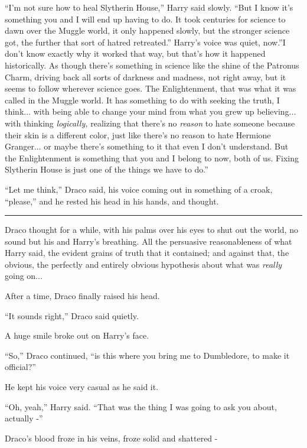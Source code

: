 ``I'm not sure how to heal Slytherin House,'' Harry said slowly. ``But I
know it's something you and I will end up having to do. It took
centuries for science to dawn over the Muggle world, it only happened
slowly, but the stronger science got, the further that sort of hatred
retreated.'' Harry's voice was quiet, now.''I don't know exactly why it
worked that way, but that's how it happened historically. As though
there's something in science like the shine of the Patronus Charm,
driving back all sorts of darkness and madness, not right away, but it
seems to follow wherever science goes. The Enlightenment, that was what
it was called in the Muggle world. It has something to do with seeking
the truth, I think... with being able to change your mind from what
you grew up believing... with thinking \emph{logically,} realizing
that there's no \emph{reason} to hate someone because their skin is a
different color, just like there's no reason to hate Hermione
Granger... or maybe there's something to it that even I don't
understand. But the Enlightenment is something that you and I belong to
now, both of us. Fixing Slytherin House is just one of the things we
have to do.''

``Let me think,'' Draco said, his voice coming out in something of a
croak, ``please,'' and he rested his head in his hands, and thought.

\begin{center}\rule{3in}{0.4pt}\end{center}

Draco thought for a while, with his palms over his eyes to shut out the
world, no sound but his and Harry's breathing. All the persuasive
reasonableness of what Harry said, the evident grains of truth that it
contained; and against that, the obvious, the perfectly and entirely
obvious hypothesis about what was \emph{really} going on...

After a time, Draco finally raised his head.

``It sounds right,'' Draco said quietly.

A huge smile broke out on Harry's face.

``So,'' Draco continued, ``is this where you bring me to Dumbledore, to
make it official?''

He kept his voice very casual as he said it.

``Oh, yeah,'' Harry said. ``That was the thing I was going to ask you
about, actually -''

Draco's blood froze in his veins, froze solid and shattered -

